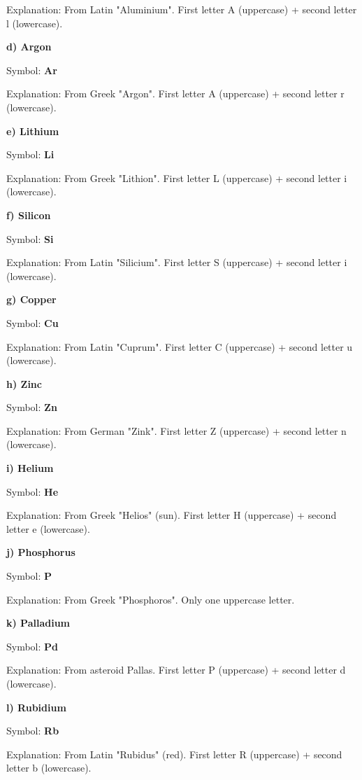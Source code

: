 \begin{exercise}
\begin{solu}
        Explanation: From Latin "Aluminium". First letter A (uppercase) + second letter l (lowercase).

        \textbf{d) Argon}

        Symbol: \textbf{Ar}

        Explanation: From Greek "Argon". First letter A (uppercase) + second letter r (lowercase).

        \textbf{e) Lithium}

        Symbol: \textbf{Li}

        Explanation: From Greek "Lithion". First letter L (uppercase) + second letter i (lowercase).

        \textbf{f) Silicon}

        Symbol: \textbf{Si}

        Explanation: From Latin "Silicium". First letter S (uppercase) + second letter i (lowercase).

        \textbf{g) Copper}

        Symbol: \textbf{Cu}

        Explanation: From Latin "Cuprum". First letter C (uppercase) + second letter u (lowercase).

        \textbf{h) Zinc}

        Symbol: \textbf{Zn}

        Explanation: From German "Zink". First letter Z (uppercase) + second letter n (lowercase).

        \textbf{i) Helium}

        Symbol: \textbf{He}

        Explanation: From Greek "Helios" (sun). First letter H (uppercase) + second letter e (lowercase).

        \textbf{j) Phosphorus}

        Symbol: \textbf{P}

        Explanation: From Greek "Phosphoros". Only one uppercase letter.

        \textbf{k) Palladium}

        Symbol: \textbf{Pd}

        Explanation: From asteroid Pallas. First letter P (uppercase) + second letter d (lowercase).

        \textbf{l) Rubidium}

        Symbol: \textbf{Rb}

        Explanation: From Latin "Rubidus" (red). First letter R (uppercase) + second letter b (lowercase).


\end{solu}
\end{exercise}

